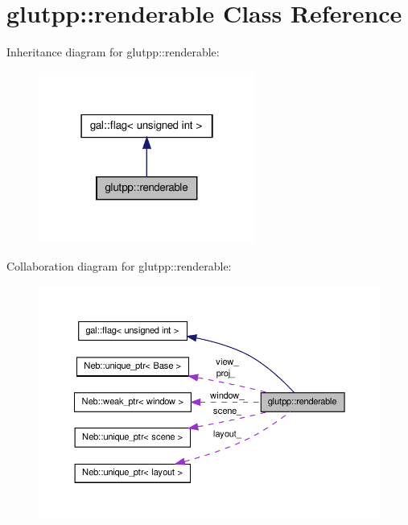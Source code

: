 \hypertarget{classglutpp_1_1renderable}{\section{glutpp\-:\-:renderable \-Class \-Reference}
\label{classglutpp_1_1renderable}
}


\-Inheritance diagram for glutpp\-:\-:renderable\-:\nopagebreak
\begin{figure}[H]
\begin{center}
\leavevmode
\includegraphics[width=202pt]{classglutpp_1_1renderable__inherit__graph}
\end{center}
\end{figure}


\-Collaboration diagram for glutpp\-:\-:renderable\-:\nopagebreak
\begin{figure}[H]
\begin{center}
\leavevmode
\includegraphics[width=350pt]{classglutpp_1_1renderable__coll__graph}
\end{center}
\end{figure}
